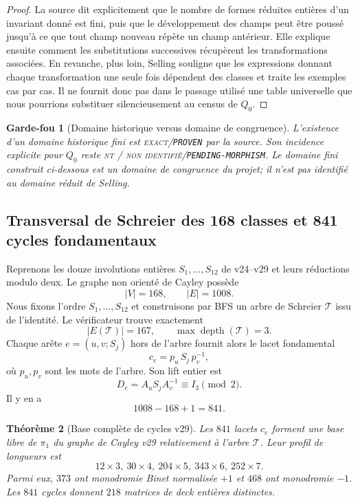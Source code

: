 \documentclass[11pt,a4paper]{article}
\newtheorem{theorem}{Théorème}[section]
\newtheorem{guardrail}[theorem]{Garde-fou}
\newcommand{\statusExact}{\textsc{exact}}
\newcommand{\statusNT}{\textsc{nt / non identifié}}
\newcommand{\certProven}{\texttt{PROVEN}}
\newcommand{\certPending}{\texttt{PENDING-MORPHISM}}
\begin{document}
\begin{proof}
La source dit explicitement que le nombre de formes r\'eduites enti\`eres d'un invariant donn\'e
est fini, puis que le d\'eveloppement des champs peut \^etre pouss\'e jusqu'\`a ce que tout champ
nouveau r\'ep\`ete un champ ant\'erieur. Elle explique ensuite comment les substitutions successives
r\'ecup\`erent les transformations associ\'ees. En revanche, plus loin, Selling souligne que les
expressions donnant chaque transformation une seule fois d\'ependent des classes et traite les
exemples cas par cas. Il ne fournit donc pas dans le passage utilis\'e une table universelle que nous
pourrions substituer silencieusement au census de $Q_0$.
\end{proof}

\begin{guardrail}[Domaine historique versus domaine de congruence]
L'existence d'un domaine historique fini est \statusExact{}/\certProven{} par la source. Son
\emph{incidence explicite} pour $Q_0$ reste \statusNT{}/\certPending{}. Le domaine fini construit
ci-dessous est un domaine de congruence du projet; il n'est pas identifi\'e au domaine r\'eduit de
Selling.
\end{guardrail}

\subsection{Transversal de Schreier des 168 classes et 841 cycles fondamentaux}

Reprenons les douze involutions enti\`eres $S_1,\ldots,S_{12}$ de v24--v29 et leurs r\'eductions
modulo deux. Le graphe non orient\'e de Cayley poss\`ede
\[
 |V|=168,\qquad |E|=1008.
\]
Nous fixons l'ordre $S_1,\ldots,S_{12}$ et construisons par BFS un arbre de Schreier $\mathcal T$
issu de l'identit\'e. Le v\'erificateur trouve exactement
\[
 |E(\mathcal T)|=167,\qquad \max\operatorname{depth}(\mathcal T)=3.
\]
Chaque ar\^ete $e=(u,v;S_j)$ hors de l'arbre fournit alors le lacet fondamental
\[
 c_e=p_u\,S_j\,p_v^{-1},
\]
o\`u $p_u,p_v$ sont les mots de l'arbre. Son lift entier est
\begin{equation}\label{eq:v35-deck-defect}
 \boxed{D_e=A_uS_jA_v^{-1}\equiv I_3\pmod2.}
\end{equation}
Il y en a
\begin{equation}\label{eq:v35-cycle-rank}
 \boxed{1008-168+1=841.}
\end{equation}

\begin{theorem}[Base compl\`ete de cycles v29]\label{thm:v35-841-cycle-basis}
Les $841$ lacets $c_e$ forment une base libre de $\pi_1$ du graphe de Cayley v29 relativement
\`a l'arbre $\mathcal T$. Leur profil de longueurs est
\[
 \boxed{12\times3,\ 30\times4,\ 204\times5,\ 343\times6,\ 252\times7.}
\]
Parmi eux, $373$ ont monodromie Binet normalis\'ee $+1$ et $468$ ont monodromie $-1$.
Les $841$ cycles donnent $218$ matrices de deck enti\`eres distinctes.
\end{theorem}
\end{document}
